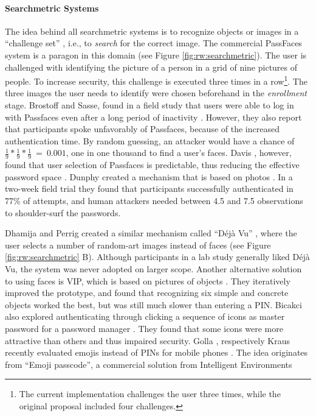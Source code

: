 	\paragraph{Searchmetric Systems}
	The idea behind all searchmetric systems is to recognize objects or images in a ``challenge set'' \cite{VonZezschwitz2016Thesis}, i.e., to \textit{search} for the correct image. The commercial PassFaces system is a paragon in this domain (see Figure \ref{fig:rw:searchmetric}). The user is challenged with identifying the picture of a person in a grid of nine pictures of people. To increase security, this challenge is executed three times in a row\footnote{The current implementation challenges the user three times, while the original proposal included four challenges.}. The three images the user needs to identify were chosen beforehand in the \textit{enrollment} stage. Brostoff and Sasse, found in a field study that users were able to log in with Passfaces even after a long period of inactivity \cite{Brostoff2000PassfacesEvaluation}. However, they also report that participants spoke unfavorably of Passfaces, because of the increased authentication time. By random guessing, an attacker would have a chance of $\frac{1}{9}*\frac{1}{9}*\frac{1}{9}~=~0.001$, \ie one in one thousand to find a user's faces. Davis \etal, however, found that user selection of Passfaces is predictable, thus reducing the effective password space \cite{Davis2004UserChoiceGraphical}. Dunphy \etal created a mechanism that is based on photos \cite{Dunphy2010CloserLookGraphical}. In a two-week field trial they found that participants successfully authenticated in 77\% of attempts, and human attackers needed between 4.5 and 7.5 observations to shoulder-surf the passwords. 
	
	Dhamija and Perrig created a similar mechanism called ``Déjà Vu'' \cite{Dhamija2000DejaVu}, where the user selects a number of random-art images instead of faces (see Figure \ref{fig:rw:searchmetric} B). Although participants in a lab study generally liked Déjà Vu, the system was never adopted on larger scope. Another alternative solution to using faces is VIP, which is based on pictures of objects \cite{DeAngeli2002VIP, DeAngeli2005PictureThousandWords}. They iteratively improved the prototype, and found that recognizing six simple and concrete objects worked the best, but was still much slower than entering a PIN. Bicakci \etal also explored authenticating through clicking a sequence of icons as master password for a password manager \cite{Bicakci2011PWMIconBased}. They found that some icons were more attractive than others and thus impaired security. Golla \etal, respectively Kraus \etal recently evaluated emojis instead of PINs for mobile phones \cite{Golla2017EmojiAuth, Kraus2017Emoji}. The idea originates from ``Emoji passcode'', a commercial solution from Intelligent Environments
	
